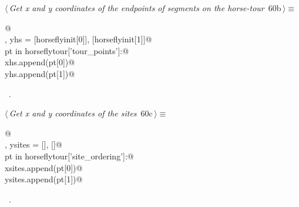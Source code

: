 \documentclass[11.5pt]{report}
\begin{document}
\vspace{-0.8cm} \newchunk
\begin{flushleft} \small
\begin{minipage}{\linewidth}\label{scrap83}\raggedright\small
{} $\langle\,${\itshape Get x and y coordinates of the endpoints of segments on the horse-tour}\nobreak\ {\footnotesize {60b}}$\,\rangle\equiv$
\vspace{-1ex}
\begin{list}{}{} \item
\mbox{}\verb@   @\\
\mbox{}\verb@xhs, yhs = [horseflyinit[0]], [horseflyinit[1]]@\\
\mbox{}\verb@for pt in horseflytour['tour_points']:@\\
\mbox{}\verb@    xhs.append(pt[0])@\\
\mbox{}\verb@    yhs.append(pt[1])@\\
\mbox{}\verb@@{\NWsep}
\end{list}
\vspace{-1.5ex}
\footnotesize
\begin{list}{}{\setlength{\itemsep}{-\parsep}\setlength{\itemindent}{-\leftmargin}}
\item \NWtxtMacroRefIn\ .

\item{}
\end{list}
\end{minipage}\vspace{4ex}
\end{flushleft}

\vspace{-0.8cm} \newchunk
\begin{flushleft} \small
\begin{minipage}{\linewidth}\label{scrap84}\raggedright\small
{} $\langle\,${\itshape Get x and y coordinates of the sites}\nobreak\ {\footnotesize {60c}}$\,\rangle\equiv$
\vspace{-1ex}
\begin{list}{}{} \item
\mbox{}\verb@   @\\
\mbox{}\verb@xsites, ysites = [], []@\\
\mbox{}\verb@for pt in horseflytour['site_ordering']:@\\
\mbox{}\verb@    xsites.append(pt[0])@\\
\mbox{}\verb@    ysites.append(pt[1])@\\
\mbox{}\verb@@{\NWsep}
\end{list}
\vspace{-1.5ex}
\footnotesize
\begin{list}{}{\setlength{\itemsep}{-\parsep}\setlength{\itemindent}{-\leftmargin}}
\item \NWtxtMacroRefIn\ .

\item{}
\end{list}
\end{minipage}\vspace{4ex}
\end{flushleft}
\end{document}
